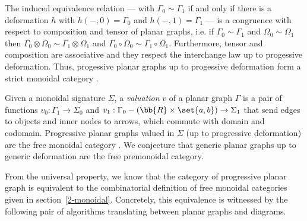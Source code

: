 The induced equivalence relation --- with $\Gamma_0 \sim \Gamma_1$ if and only if there is a deformation $h$ with $h(-, 0) = \Gamma_0$ and $h(-, 1) = \Gamma_1$ --- is a congruence with respect to composition and tensor of planar graphs,
i.e. if $\Gamma_0 \sim \Gamma_1$ and $\Omega_0 \sim \Omega_1$ then $\Gamma_0 \otimes \Omega_0 \sim \Gamma_1 \otimes \Omega_1$ and $\Gamma_0 \circ \Omega_0 \sim \Gamma_1 \circ \Omega_1$.
Furthermore, tensor and composition are associative and they respect the interchange law up to progessive deformation.
Thus, progessive planar graphs up to progessive deformation form a strict monoidal category \cite[Proposition~4]{JoyalStreet88}.

Given a monoidal signature $\Sigma$, a \emph{valuation} $v$ of a planar graph $\Gamma$ is a pair of functions $v_0 : \Gamma_1 \to \Sigma_0$ and $v_1 : \Gamma_0 - (\bb{R} \times \set{a, b}) \to \Sigma_1$ that send edges to objects and inner nodes to arrows, which commute with domain and codomain.
Progressive planar graphs valued in $\Sigma$ (up to progressive deformation) are the free monoidal category \cite[Theorem~5]{JoyalStreet88}.
We conjecture that generic planar graphs up to generic deformation are the free premonoidal category.

From the universal property, we know that the category of progressive planar graph is equivalent to the combinatorial definition of free monoidal categories given in section~\ref{2-monoidal}.
Concretely, this equivalence is witnessed by the following pair of algorithms translating between planar graphs and diagrams.

